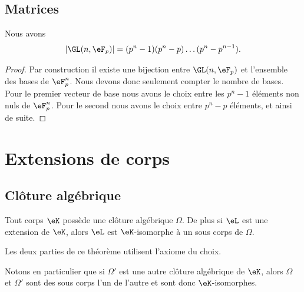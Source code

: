 \subsection{Matrices}

\begin{proposition}
    Nous avons
    \begin{equation}
        | \GL(n,\eF_p) |=(p^n-1)(p^n-p)\ldots (p^n-p^{n-1}).
    \end{equation}
\end{proposition}

\begin{proof}
    Par construction il existe une bijection entre \( \GL(n,\eF_p)\) et l'ensemble des bases de \( \eF_p^n\). Nous devons donc seulement compter le nombre de bases. Pour le premier vecteur de base nous avons le choix entre les \( p^n-1\) éléments non nuls de \( \eF_p^n\). Pour le second nous avons le choix entre \( p^n-p\) éléments, et ainsi de suite.
\end{proof}

\section{Extensions de corps}


\subsection{Clôture algébrique}

\begin{theorem}
    Tout corps \( \eK\) possède une clôture algébrique \( \Omega\). De plus si \( \eL\) est une extension de \( \eK\), alors \( \eL\) est \( \eK\)-isomorphe à un sous corps de \( \Omega\).
\end{theorem}
Les deux parties de ce théorème utilisent l'axiome du choix.

Notons en particulier que si \( \Omega'\) est une autre clôture algébrique de \( \eK\), alors \( \Omega\) et \( \Omega'\) sont des sous corps l'un de l'autre et sont donc \( \eK\)-isomorphes.


